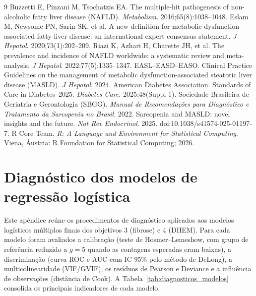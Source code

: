 \documentclass[11pt,a4paper]{article}
\begin{document}
\clearpage
{}
\begin{thebibliography}{9}
   Buzzetti E, Pinzani M, Tsochatzis EA. The multiple-hit pathogenesis of
        non-alcoholic fatty liver disease (NAFLD). \textit{Metabolism}.
        2016;65(8):1038--1048.
   Eslam M, Newsome PN, Sarin SK, et al. A new definition for
        metabolic dysfunction-associated fatty liver disease: an international
        expert consensus statement. \textit{J Hepatol}. 2020;73(1):202--209.
   Riazi K, Azhari H, Charette JH, et al. The prevalence and incidence of
        NAFLD worldwide: a systematic review and meta-analysis.
        \textit{J Hepatol}. 2022;77(5):1335--1347.
   EASL--EASD--EASO. Clinical Practice Guidelines on the management of
        metabolic dysfunction-associated steatotic liver disease (MASLD).
        \textit{J Hepatol}. 2024.
   American Diabetes Association. Standards of Care in Diabetes--2025.
        \textit{Diabetes Care}. 2025;48(Suppl 1).
   Sociedade Brasileira de Geriatria e Gerontologia (SBGG). \textit{Manual
        de Recomendações para Diagnóstico e Tratamento da Sarcopenia no
        Brasil}. 2022.
   Sarcopenia and MASLD: novel insights and the future.
        \textit{Nat Rev Endocrinol}. 2025. doi:10.1038/s41574-025-01197-7.
   R Core Team. \textit{R: A Language and Environment for Statistical
        Computing}. Viena, Áustria: R Foundation for Statistical Computing;
        2026.
\end{thebibliography}

\clearpage
\appendix
\section{Diagnóstico dos modelos de regressão logística}

Este apêndice reúne os procedimentos de diagnóstico aplicados aos modelos
logísticos múltiplos finais dos objetivos 3 (fibrose) e 4 (DHEM). Para cada
modelo foram avaliados a calibração (teste de Hosmer--Lemeshow, com grupo de
referência reduzido a $g = 5$ quando as contagens esperadas eram baixas), a
discriminação (curva ROC e AUC com IC 95\% pelo método de DeLong), a
multicolinearidade (VIF/GVIF), os resíduos de Pearson e Deviance e a influência
de observações (distância de Cook). A Tabela~\ref{tab:diagnosticos_modelos}
consolida os principais indicadores de cada modelo.
\end{document}

